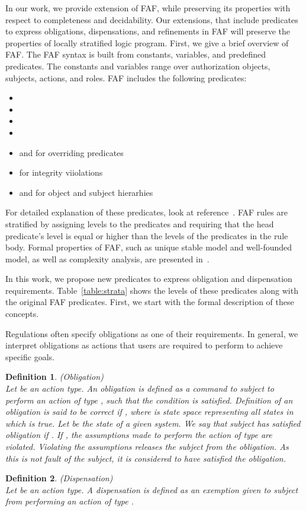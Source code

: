 \documentclass[12pt,journal,letterpaper,onecolumn]{IEEEtran}
\newtheorem{definition}{Definition}[section]
\begin{document}
In our work, we provide extension of FAF, while preserving its 
properties with respect to completeness and decidability. 
 Our extensions, that include predicates to express obligations,
dispensations, and refinements in FAF will preserve the 
properties of locally stratified logic program.
First, we give a brief overview of FAF.  The FAF syntax is built from constants, variables, and
predefined predicates.  The constants and variables range over authorization objects, subjects,
actions, and roles.  FAF includes the following predicates:
\begin{itemize}
\item 
\item 
\item 
\item 
\item  and  for overriding predicates
\item  for integrity viiolations
\item  and  for object and subject hierarhies
\end{itemize}
For detailed explanation of these predicates, look at reference~\cite{Jajodia01}.  FAF rules
are stratified by assigning levels to the predicates and requiring that the head predicate's
level is equal or higher than the levels of the predicates in the rule body.
Formal properties of FAF, such as unique stable model and well-founded model, as well as complexity
analysis, are presented in~\cite{Jajodia01}.

In this work, we propose new predicates to express obligation and dispensation requirements. Table~\ref{table:strata} shows the levels of these predicates along with the original FAF
predicates.  First, we start with the formal description of
these concepts.

Regulations often specify obligations as one of their requirements.
In general, we interpret obligations as actions that users are
required to perform to achieve specific goals. 
\begin{definition}(Obligation) \\
Let  be an action type. An obligation
 is defined as a command to subject  to
perform an action of type , such that the condition  is
satisfied. Definition of an obligation is said to be correct if
, where  is state space
representing all states in which  is true. Let  be the
state of a given system. We say that subject  has satisfied
obligation  if . If
, the assumptions made to perform
the action of type  are violated. Violating the assumptions
releases the subject from the obligation. As this is not fault of
the subject, it is considered to have satisfied the obligation.
 \label{def:obligation}
\end{definition}
\begin{definition}(Dispensation)\\
Let  be an action type. A dispensation
 is defined as an exemption given to subject 
from performing an action of type .
 \label{def:dispensation}
\end{definition}
\end{document}
